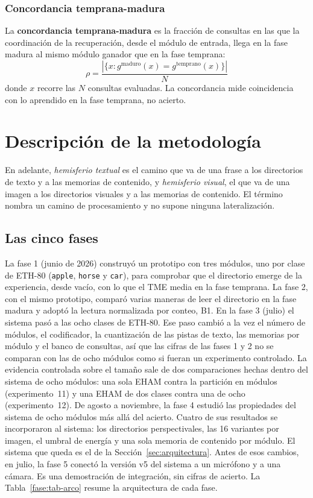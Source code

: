 \subsubsection*{Concordancia temprana-madura}

La \textbf{concordancia temprana-madura} es la fracción de consultas en las que la
coordinación de la recuperación, desde el módulo de entrada, llega en la fase madura al
mismo módulo ganador que en la fase temprana:
\begin{equation}
    \rho = \frac{|\{x : g^{\mathrm{maduro}}(x) = g^{\mathrm{temprano}}(x)\}|}{N}
    \label{eq:concordancia}
\end{equation}
donde $x$ recorre las $N$ consultas evaluadas.
La concordancia mide coincidencia con lo aprendido en la fase temprana, no acierto.

\section{Descripción de la metodología}
\label{sec:metodologia}
En adelante, \emph{hemisferio textual} es el camino que va de una frase a los
directorios de texto y a las memorias de contenido, y \emph{hemisferio visual}, el que
va de una imagen a los directorios visuales y a las memorias de contenido.
El término nombra un camino de procesamiento y no supone ninguna lateralización.

\subsection{Las cinco fases}
\label{fase:arco}

La fase 1 (junio de 2026) construyó un prototipo con tres módulos, uno por clase de
ETH-80 (\texttt{apple}, \texttt{horse} y \texttt{car}), para comprobar que el
directorio emerge de la experiencia, desde vacío, con lo que el TME media en la fase
temprana.
La fase 2, con el mismo prototipo, comparó varias maneras de leer el directorio en la
fase madura y adoptó la lectura normalizada por conteo, B1.
En la fase 3 (julio) el sistema pasó a las ocho clases de ETH-80.
Ese paso cambió a la vez el número de módulos, el codificador, la cuantización de las
pistas de texto, las memorias por módulo y el banco de consultas, así que las cifras de
las fases 1 y 2 no se comparan con las de ocho módulos como si fueran un experimento
controlado.
La evidencia controlada sobre el tamaño sale de dos comparaciones hechas dentro del
sistema de ocho módulos: una sola EHAM contra la partición en módulos (experimento~11)
y una EHAM de dos clases contra una de ocho (experimento~12).
De agosto a noviembre, la fase 4 estudió las propiedades del sistema de ocho módulos
más allá del acierto.
Cuatro de sus resultados se incorporaron al sistema: los directorios perspectivales,
las 16 variantes por imagen, el umbral de energía y una sola memoria de contenido por
módulo.
El sistema que queda es el de la Sección~\ref{sec:arquitectura}.
Antes de esos cambios, en julio, la fase 5 conectó la versión v5 del sistema a un
micrófono y a una cámara.
Es una demostración de integración, sin cifras de acierto.
La Tabla~\ref{fase:tab-arco} resume la arquitectura de cada fase.

